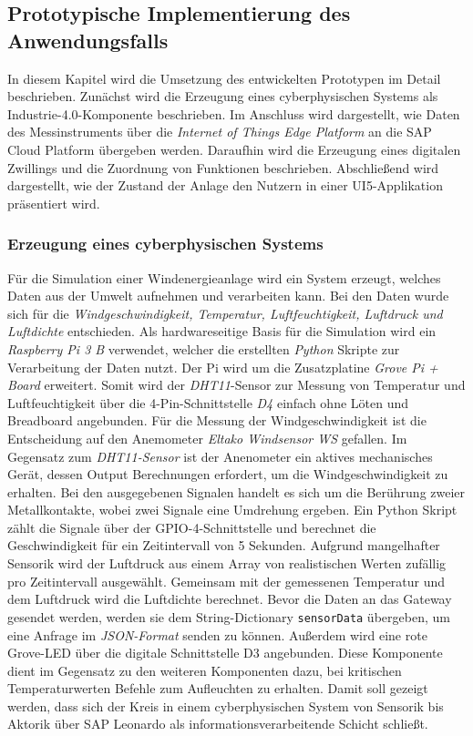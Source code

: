 

\subsection{Prototypische Implementierung des Anwendungsfalls}

In diesem Kapitel wird die Umsetzung des entwickelten Prototypen im Detail beschrieben.
Zunächst wird die Erzeugung eines cyberphysischen Systems als Industrie-4.0-Komponente beschrieben. Im Anschluss wird dargestellt, wie Daten des Messinstruments über die \textit{Internet of Things Edge Platform} an die SAP Cloud Platform übergeben werden. Daraufhin wird die Erzeugung eines digitalen Zwillings und die Zuordnung von Funktionen beschrieben. Abschließend wird dargestellt, wie der Zustand der Anlage den Nutzern in einer UI5-Applikation präsentiert wird.

\subsubsection{Erzeugung eines cyberphysischen Systems}

Für die Simulation einer Windenergieanlage wird ein System erzeugt, welches Daten aus der Umwelt aufnehmen und verarbeiten kann. Bei den Daten wurde sich für die \textit{Windgeschwindigkeit, Temperatur, Luftfeuchtigkeit, Luftdruck und Luftdichte} entschieden.
Als hardwareseitige Basis für die Simulation wird ein \textit{Raspberry Pi 3 B} verwendet, welcher die erstellten \textit{Python} Skripte zur Verarbeitung der Daten nutzt. Der Pi wird um die Zusatzplatine \textit{Grove Pi + Board} erweitert. Somit wird der \textit{DHT11}-Sensor zur Messung von Temperatur und Luftfeuchtigkeit über die 4-Pin-Schnittstelle \textit{D4} einfach ohne Löten und Breadboard angebunden. Für die Messung der Windgeschwindigkeit ist die Entscheidung auf den Anemometer \textit{Eltako Windsensor WS} gefallen. Im Gegensatz zum \textit{DHT11-Sensor} ist der Anenometer ein aktives mechanisches Gerät, dessen Output Berechnungen erfordert, um die Windgeschwindigkeit zu erhalten. Bei den ausgegebenen Signalen handelt es sich um die Berührung zweier Metallkontakte, wobei zwei Signale eine Umdrehung ergeben. Ein Python Skript zählt die Signale über der GPIO-4-Schnittstelle und berechnet die Geschwindigkeit für ein Zeitintervall von 5 Sekunden. Aufgrund mangelhafter Sensorik wird der Luftdruck aus einem Array von realistischen Werten zufällig pro Zeitintervall ausgewählt. Gemeinsam mit der gemessenen Temperatur und dem Luftdruck wird die Luftdichte berechnet. Bevor die Daten an das Gateway gesendet werden, werden sie dem String-Dictionary \texttt{sensorData} übergeben, um eine Anfrage im \textit{JSON-Format} senden zu können.
 Außerdem wird eine rote Grove-LED über die digitale Schnittstelle D3 angebunden. Diese Komponente dient im Gegensatz zu den weiteren Komponenten dazu, bei kritischen Temperaturwerten Befehle zum Aufleuchten zu erhalten. Damit soll gezeigt werden, dass sich der Kreis in einem cyberphysischen System von Sensorik bis Aktorik über SAP Leonardo als informationsverarbeitende Schicht schließt.

